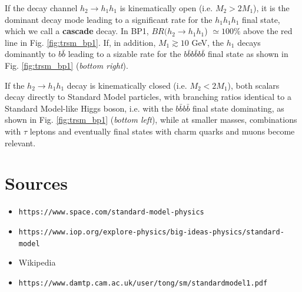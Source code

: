 \documentclass{article}
\begin{document}
If the decay channel $h_2 \rightarrow h_1 h_1$ is kinematically open (i.e. $M_2 > 2M_1$), it is the dominant decay mode leading to a significant rate for the $h_1 h_1 h_1$ final state, which we call a \textbf{cascade} decay. In BP1, $BR(h_2 \rightarrow h_1h_1$) $\simeq 100\%$ above the red line in Fig. \ref{fig:trsm_bp1}. If, in addition, $M_1 \gtrsim 10$ GeV, the $h_1$ decays dominantly to $b\bar{b}$ leading to a sizable rate for the $b\bar{b}b\bar{b}b\bar{b}$ final state as shown in Fig. \ref{fig:trsm_bp1} (\textit{bottom right}).

If the $h_2 \rightarrow h_1 h_1$ decay is kinematically closed (i.e. $M_2 < 2M_1$), both scalars decay directly to Standard Model particles, with branching ratios identical to a Standard Model-like Higgs boson, i.e. with the $b\bar{b}b\bar{b}$ final state dominating, as shown in Fig. \ref{fig:trsm_bp1} (\textit{bottom left}), while at smaller masses, combinations with $\tau$ leptons and eventually final states with charm quarks and muons become relevant.

\section{Sources}

    \begin{itemize}
        \item \texttt{https://www.space.com/standard-model-physics}
        \item \texttt{https://www.iop.org/explore-physics/big-ideas-physics/standard-model}
        \item Wikipedia
        \item \texttt{https://www.damtp.cam.ac.uk/user/tong/sm/standardmodel1.pdf}
    \end{itemize}
\end{document}
